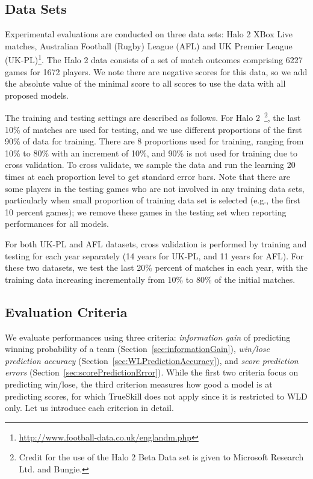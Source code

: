 \subsection{Data Sets}

\label{sec:data_sets}

Experimental evaluations are conducted on three data sets: Halo 2 XBox Live
matches, Australian Football
(Rugby) League (AFL)%
and UK
Premier League (UK-PL)\footnote{\noindent \url{http://www.football-data.co.uk/englandm.php}}.  The Halo 2 data consists of a
set of match outcomes comprising 6227 games for 1672 players. We note there are negative scores for this data, so we add the absolute value of the minimal score to all scores to use the data with all proposed models.

The training and testing settings are described as follows.  For Halo
2~\footnote{\noindent Credit for the use of the Halo 2 Beta Data set
is given to Microsoft Research Ltd. and Bungie.}, the last 10\%
of matches are used for testing, and we use different proportions of
the first 90\% of data for training. There are 8 proportions used
for training, ranging from 10\% to 80\% with an increment of
10\%, and 90\% is not used for training due to cross validation. To cross validate, we sample the data and run the learning 20 times at each proportion level
to get standard error bars. Note that there are some players in the
testing games who are not involved in any training data sets,
particularly when small proportion of training data set is selected
(e.g., the first 10 percent games); we remove these games in the
testing set when reporting performances for all models.

For both UK-PL and AFL datasets, cross validation is performed by
training and testing for each year separately (14 years for UK-PL, and
11 years for AFL).  For these two datasets, we test the last 20\%
percent of matches in each year, with the training data increasing
incrementally from 10\% to 80\% of the initial matches.

\subsection{Evaluation Criteria}

We evaluate performances using three criteria: {\it information gain}
of predicting winning probability of a team
(Section~\ref{sec:informationGain}),
{\it win/lose prediction accuracy}
(Section~\ref{sec:WLPredictionAccuracy}),
and {\it score prediction errors}
(Section~\ref{sec:scorePredictionError}).
While the first two criteria focus on predicting win/lose, the third
criterion measures how good a model is at predicting scores, for which
TrueSkill does not apply since it is restricted to WLD only. Let us
introduce each criterion in detail.

